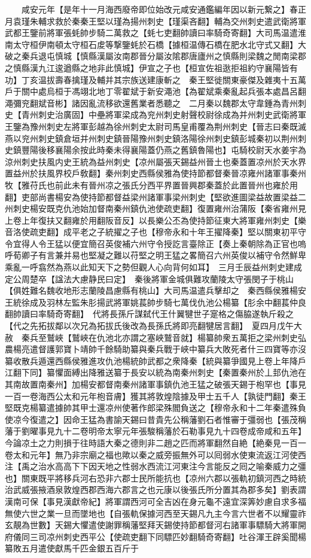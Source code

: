 　　咸安元年【是年十一月海西廢帝即位始改元咸安通鑑編年因以新元繋之】春正月袁瑾朱輔求救於秦秦王堅以瑾為揚州刺史【瑾渠吝翻】輔為交州刺史遣武衛將軍武都王鑒前將軍張蚝帥步騎二萬救之【蚝七吏翻帥讀曰率騎奇寄翻】大司馬温遣淮南太守桓伊南頓太守桓石䖍等撃鑒蚝於石橋【據桓温傳石橋在肥水北守式又翻】大破之秦兵退屯慎城【慎縣漢屬汝南郡晉分屬汝隂郡唐廬州之慎縣則梁魏之閒南梁郡之慎縣漢九江逡遒縣之地非此慎城】伊宣之子也【桓宣佐祖逖拒祖約守襄陽皆有功】丁亥温拔壽春擒瑾及輔并其宗族送建康斬之　秦王堅徙關東豪傑及雜夷十五萬戶于關中處烏桓于馮翊北地丁零翟斌于新安澠池【為翟斌乘秦亂起兵張本處昌呂翻澠彌兖翻斌音彬】諸因亂流移欲還舊業者悉聽之　二月秦以魏郡太守韋鍾為青州刺史【青州刺史治廣固】中壘將軍梁成為兖州刺史射聲校尉徐成為并州刺史武衛將軍王鑒為豫州刺史左將軍彭越為徐州刺史太尉司馬皇甫覆為荆州刺史【晉志曰秦既滅燕以兖州刺史鎮倉垣并州刺史鎮晉陽豫州刺史鎮洛陽徐州刺史鎮彭城秦初以荆州刺史鎮豐陽後移襄陽余按此時秦未得襄陽蓋仍燕之舊鎮魯陽也】屯騎校尉天水姜宇為涼州刺史扶風内史王統為益州刺史【凉州屬張天錫益州晉土也秦蓋置凉州於天水界置益州於扶風界校戶敎翻】秦州刺史西縣侯雅為使持節都督秦晉凉雍州諸軍事秦州牧【雅苻氏也前此未有晉州凉之張氏分西平界置晉興郡秦蓋於此置晉州也雍於用翻】吏部尚書楊安為使持節都督益梁州諸軍事梁州刺史【堅欲進圖梁益故置梁益二州刺史楊安既克仇池始加督南秦州鎮仇池使疏吏翻】復置雍州治蒲阪【秦省雍州見上卷上年復扶又翻雍於用翻阪音反】以長樂公丕為使持節征東大將軍雍州刺史【樂音洛使疏吏翻】成平老之子統擢之子也【穆帝永和十年王擢降秦】堅以關東初平守令宜得人令王猛以便宜簡召英俊補六州守令授訖言臺除正【奏上秦朝除為正官也嗚呼荀卿子有言兼并易也堅凝之難以苻堅之明王猛之畧簡召六州英俊以補守令然鮮卑乘亂一呼翕然為燕以此知天下之勢但觀人心向背何如耳】　三月壬辰益州刺史建成定公周楚卒【諡法大慮静民曰定】　秦後將軍金城俱難攻蘭陵太守張閔子于桃山【俱姓難名魏收地形志蘭陵昌慮縣有桃山】大司馬温遣兵擊却之　秦西縣侯雅楊安王統徐成及羽林左監朱肜揚武將軍姚萇帥步騎七萬伐仇池公楊纂【肜余中翻萇仲良翻帥讀曰率騎奇寄翻】　代將長孫斤謀弑代王什翼犍世子寔格之傷脇遂執斤殺之【代之先拓拔鄰以次兄為拓拔氏後改為長孫氏將即亮翻犍居言翻】　夏四月戊午大赦　秦兵至鷲峽【鷲峽在仇池北亦謂之塞峽鷲音就】楊纂帥衆五萬拒之梁州刺史弘農楊亮遣督護郭寶卜靖帥千餘騎助纂與秦兵戰于峽中纂兵大敗死者什三四寶等亦沒纂收散兵遁還西縣侯雅進攻仇池楊統帥武都之衆降秦【統與纂爭國見上卷上年降戶江翻下同】纂懼面縛出降雅送纂于長安以統為南秦州刺史【秦置秦州於丄邽仇池在其南故置南秦州】加楊安都督南秦州諸軍事鎮仇池王猛之破張天錫于枹罕也【事見一百一卷海西公太和元年枹音膚】獲其將敦煌陰據及甲士五千人【孰徒門翻】秦王堅既克楊纂遣據帥其甲士還凉州使著作郎梁殊閻負送之【穆帝永和十二年秦遣殊負使凉今復遣之】因命王猛為書諭天錫曰昔貴先公稱藩劉石者惟審于彊弱也【張茂稱藩于劉曜事見九十二卷明帝太寧元年張駿稱藩於石勒事見九十四卷成帝咸和五年】今論凉土之力則損于往時語大秦之德則非二趙之匹而將軍翻然自絶【絶秦見一百一卷太和元年】無乃非宗廟之福也歟以秦之威旁振無外可以囘弱水使東流返江河使西注【禹之治水高高下下因天地之性弱水西流江河東注今言能反之囘之喻秦威力之彊也】關東既平將移兵河右恐非六郡士民所能抗也【凉州六郡以張軌初鎮河西之時統治武威張掖酒泉敦煌西郡西海六郡言之也元康以後張氏所分置其為郡多矣】劉表謂漢南可保【事見漢獻帝紀】將軍謂西河可全吉凶在身元龜不遠宜深筭妙慮自求多福無使六世之業一旦而墜地也【自張軌保據河西至天錫凡九主今言六世者不以耀靈祚玄靚為世數】天錫大懼遣使謝罪稱藩堅拜天錫使持節都督河右諸軍事驃騎大將軍開府儀同三司凉州刺史西平公【使疏吏翻下同驃匹妙翻騎奇寄翻】吐谷渾王辟奚聞楊纂敗五月遣使獻馬千匹金銀五百斤于